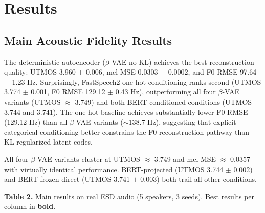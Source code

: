 \documentclass{article}
\begin{document}
\section{Results}

\label{sec:results}

\subsection{Main Acoustic Fidelity Results}

\label{sec:main_acoustic_fidelity_results}

The deterministic autoencoder ($\beta$-VAE no-KL) achieves the best reconstruction quality: UTMOS 3.960 $\pm$ 0.006, mel-MSE 0.0303 $\pm$ 0.0002, and F0 RMSE 97.64 $\pm$ 1.23 Hz. Surprisingly, FastSpeech2 one-hot conditioning ranks second (UTMOS 3.774 $\pm$ 0.001, F0 RMSE 129.12 $\pm$ 0.43 Hz), outperforming all four $\beta$-VAE variants (UTMOS $\approx$ 3.749) and both BERT-conditioned conditions (UTMOS 3.744 and 3.741). The one-hot baseline achieves substantially lower F0 RMSE (129.12 Hz) than all $\beta$-VAE variants ($\sim$138.7 Hz), suggesting that explicit categorical conditioning better constrains the F0 reconstruction pathway than KL-regularized latent codes.

All four $\beta$-VAE variants cluster at UTMOS $\approx$ 3.749 and mel-MSE $\approx$ 0.0357 with virtually identical performance. BERT-projected (UTMOS 3.744 $\pm$ 0.002) and BERT-frozen-direct (UTMOS 3.741 $\pm$ 0.003) both trail all other conditions.

\textbf{Table 2.} Main results on real ESD audio (5 speakers, 3 seeds). Best results per column in \textbf{bold}.
\end{document}
